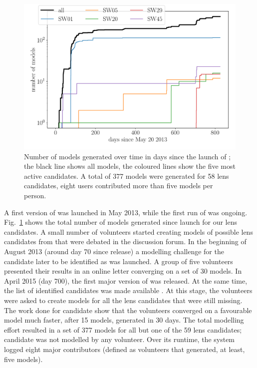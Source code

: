 \begin{figure}
  \includegraphics[width=\linewidth]{img/timelapse3}
  \caption{ Number of models generated over time in days since the
    launch of \SpL; the black line shows all models, the coloured
    lines show the five most active candidates. A total of 377 models
    were generated for 58 lens candidates, eight users contributed
    more than five models per person. }
  \label{fig:time}
\end{figure}


A first version of \SpL
was launched in May 2013, while
the first run of \SW was ongoing.  Fig.~\ref{fig:time} shows the
total number of models generated since launch for our lens candidates.
A small number of volunteers started creating models of possible lens
candidates from \SW that were debated in the discussion forum.  In the
beginning of August 2013 (around day 70 since release) a modelling
challenge for the candidate later to be identified as  was
launched.  A group of five volunteers presented their results in an
online letter
converging on a set of 30 models. In April 2015 (day 700),
the first major version of \SpL was released. At the same time,
the list of identified candidates was made available \citep[as a preprint
  of][]{2016MNRAS.455.1191M}.  At this stage, the volunteers were
asked to create models for all the lens candidates that were still
missing.  The work done for candidate  show that the
volunteers converged on a favourable model much faster, after 15
models, generated in 30 days.  The total modelling effort resulted in
a set of 377 \SpL models for all but one of the 59 \SW lens
candidates; candidate  was not modelled by any volunteer.  Over
its runtime, the system logged eight major contributors (defined as
volunteers that generated, at least, five models).

